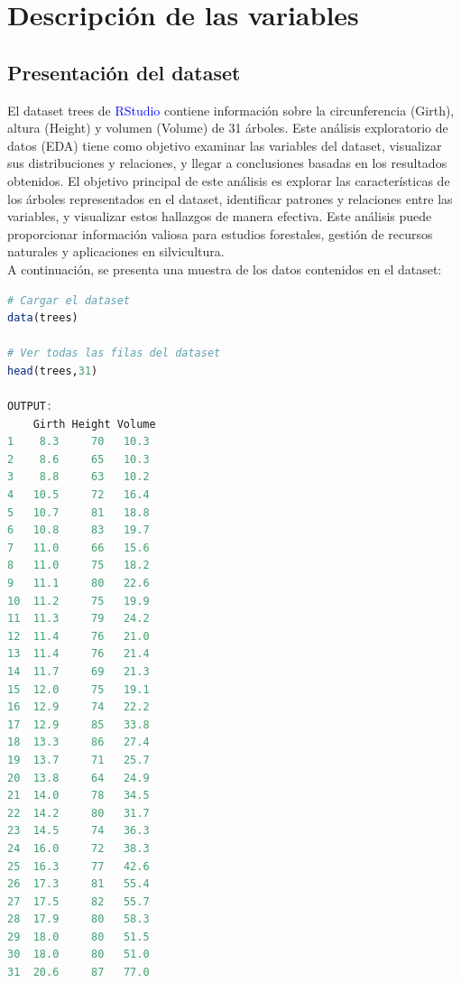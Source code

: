 \documentclass{article}
\begin{document}
\section{Descripción de las variables}
\subsection{Presentación del dataset}
El dataset trees de \textcolor{blue}{RStudio} contiene información sobre la circunferencia (Girth), altura (Height) y volumen (Volume) de 31 árboles. Este análisis exploratorio de datos (EDA) tiene como objetivo examinar las variables del dataset, visualizar sus distribuciones y relaciones, y llegar a conclusiones basadas en los resultados obtenidos. El objetivo principal de este análisis es explorar las características de los árboles representados en el dataset, identificar patrones y relaciones entre las variables, y visualizar estos hallazgos de manera efectiva. Este análisis puede proporcionar información valiosa para estudios forestales, gestión de recursos naturales y aplicaciones en silvicultura.\\
A continuación, se presenta una muestra de los datos contenidos en el dataset:
\begin{lstlisting}[language=R, caption=Cargando y visualizando el dataset]
# Cargar el dataset
data(trees)

# Ver todas las filas del dataset
head(trees,31)

OUTPUT:
    Girth Height Volume
1    8.3     70   10.3
2    8.6     65   10.3
3    8.8     63   10.2
4   10.5     72   16.4
5   10.7     81   18.8
6   10.8     83   19.7
7   11.0     66   15.6
8   11.0     75   18.2
9   11.1     80   22.6
10  11.2     75   19.9
11  11.3     79   24.2
12  11.4     76   21.0
13  11.4     76   21.4
14  11.7     69   21.3
15  12.0     75   19.1
16  12.9     74   22.2
17  12.9     85   33.8
18  13.3     86   27.4
19  13.7     71   25.7
20  13.8     64   24.9
21  14.0     78   34.5
22  14.2     80   31.7
23  14.5     74   36.3
24  16.0     72   38.3
25  16.3     77   42.6
26  17.3     81   55.4
27  17.5     82   55.7
28  17.9     80   58.3
29  18.0     80   51.5
30  18.0     80   51.0
31  20.6     87   77.0
\end{lstlisting}

\newpage
\end{document}
